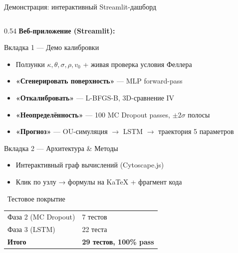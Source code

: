 \documentclass[aspectratio=169, 10pt]{beamer}
\begin{document}
\begin{frame}{Демонстрация: интерактивный Streamlit-дашборд}
  \begin{columns}[T]

    \begin{column}{0.54\textwidth}
      \textbf{Веб-приложение (Streamlit):}\\[0.4em]
      \begin{block}{Вкладка 1 — Демо калибровки}
        \small
        \begin{itemize}
          \item Ползунки $\kappa, \theta, \sigma, \rho, v_0$
                + живая проверка условия Феллера
          \item \textbf{«Сгенерировать поверхность»} — MLP forward-pass
          \item \textbf{«Откалибровать»} — L-BFGS-B, 3D-сравнение IV
          \item \textbf{«Неопределённость»} — 100 MC Dropout passes,
                $\pm 2\sigma$ полосы
          \item \textbf{«Прогноз»} — OU-симуляция $\to$ LSTM
                $\to$ траектория 5 параметров
        \end{itemize}
      \end{block}

      \vspace{0.4em}
      \begin{block}{Вкладка 2 — Архитектура \& Методы}
        \small
        \begin{itemize}
          \item Интерактивный граф вычислений (Cytoscape.js)
          \item Клик по узлу → формулы на KaTeX + фрагмент кода
        \end{itemize}
      \end{block}

      \vspace{0.4em}
      \begin{exampleblock}{\faFlask\ Тестовое покрытие}
        \small
        \begin{tabular}{@{}ll@{}}
          Фаза 2 (MC Dropout) & 7 тестов \\
          Фаза 3 (LSTM)       & 22 теста \\
          \textbf{Итого}      & \textbf{29 тестов, 100\% pass} \\
        \end{tabular}
      \end{exampleblock}
    \end{column}


\end{columns}
\end{frame}
\end{document}
